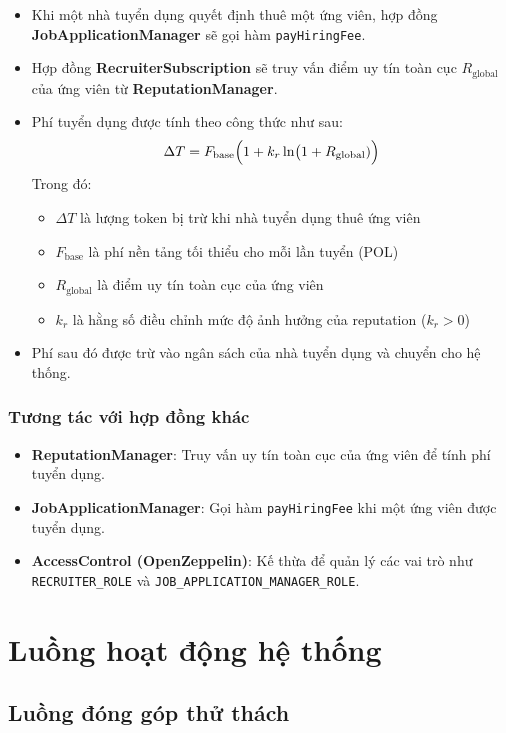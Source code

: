 \begin{itemize}
  \item Khi một nhà tuyển dụng quyết định thuê một ứng viên, hợp đồng \textbf{JobApplicationManager} sẽ gọi hàm \texttt{payHiringFee}.
  \item Hợp đồng \textbf{RecruiterSubscription} sẽ truy vấn điểm uy tín toàn cục $R_{\text{global}}$ của ứng viên từ \textbf{ReputationManager}.
  \item Phí tuyển dụng được tính theo công thức như sau:
        \[ \Delta T = F_{\text{base}}\Bigl(1 + k_r \ln\bigl(1 + R_{\text{global}}) \Bigr) \]
        Trong đó:
        \begin{itemize}
          \item $\Delta T$ là lượng token bị trừ khi nhà tuyển dụng thuê ứng viên
          \item $F_{\text{base}}$ là phí nền tảng tối thiểu cho mỗi lần tuyển (POL)
          \item $R_{\text{global}}$ là điểm uy tín toàn cục của ứng viên
          \item $k_r$ là hằng số điều chỉnh mức độ ảnh hưởng của reputation ($k_r>0$)
        \end{itemize}
  \item Phí sau đó được trừ vào ngân sách của nhà tuyển dụng và chuyển cho hệ thống.
\end{itemize}

\subsubsection{Tương tác với hợp đồng khác}

\begin{itemize}
  \item \textbf{ReputationManager}: Truy vấn uy tín toàn cục của ứng viên để tính phí tuyển dụng.
  \item \textbf{JobApplicationManager}: Gọi hàm \texttt{payHiringFee} khi một ứng viên được tuyển dụng.
  \item \textbf{AccessControl (OpenZeppelin)}: Kế thừa để quản lý các vai trò như \texttt{RECRUITER\_ROLE} và \texttt{JOB\_APPLICATION\_MANAGER\_ROLE}.
\end{itemize}

\section{Luồng hoạt động hệ thống}
\subsection{Luồng đóng góp thử thách}

